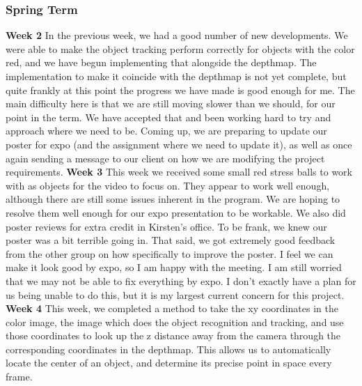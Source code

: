 \documentclass[onecolumn, draftclsnofoot,10pt, compsoc]{IEEEtran}
\begin{document}
\subsubsection{Spring Term}
\textbf{Week 2}
\newline
In the previous week, we had a good number of new developments. We were able to make the object tracking perform correctly for objects with the color red, and we have begun implementing that alongside the depthmap. The implementation to make it coincide with the depthmap is not yet complete, but quite frankly at this point the progress we have made is good enough for me.
\newline
The main difficulty here is that we are still moving slower than we should, for our point in the term. We have accepted that and been working hard to try and approach where we need to be.
\newline
Coming up, we are preparing to update our poster for expo (and the assignment where we need to update it), as well as once again sending a message to our client on how we are modifying the project requirements.
\newline
\textbf{Week 3}
\newline
This week we received some small red stress balls to work with as objects for the video to focus on. They appear to work well enough, although there are still some issues inherent in the program. We are hoping to resolve them well enough for our expo presentation to be workable.
\newline
We also did poster reviews for extra credit in Kirsten's office. To be frank, we knew our poster was a bit terrible going in. That said, we got extremely good feedback from the other group on how specifically to improve the poster. I feel we can make it look good by expo, so I am happy with the meeting.
\newline
I am still worried that we may not be able to fix everything by expo. I don't exactly have a plan for us being unable to do this, but it is my largest current concern for this project.
\newline
\textbf{Week 4}
\newline
This week, we completed a method to take the xy coordinates in the color image, the image which does the object recognition and tracking, and use those coordinates to look up the z distance away from the camera through the corresponding coordinates in the depthmap. This allows us to automatically locate the center of an object, and determine its precise point in space every frame.
\end{document}
